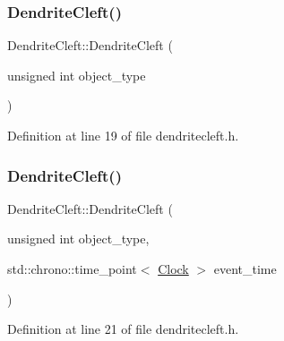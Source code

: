 \subsubsection{\texorpdfstring{Dendrite\+Cleft()}{DendriteCleft()}\hspace{0.1cm}{\footnotesize\ttfamily [2/4]}}
{\footnotesize\ttfamily Dendrite\+Cleft\+::\+Dendrite\+Cleft (\begin{DoxyParamCaption}\item[{unsigned int}]{object\+\_\+type }\end{DoxyParamCaption})\hspace{0.3cm}{\ttfamily [inline]}}



Definition at line 19 of file dendritecleft.\+h.

\mbox{\label{class_dendrite_cleft_ad4070ce743d8302bc120ea948890ea37}} 
\subsubsection{\texorpdfstring{Dendrite\+Cleft()}{DendriteCleft()}\hspace{0.1cm}{\footnotesize\ttfamily [3/4]}}
{\footnotesize\ttfamily Dendrite\+Cleft\+::\+Dendrite\+Cleft (\begin{DoxyParamCaption}\item[{unsigned int}]{object\+\_\+type,  }\item[{std\+::chrono\+::time\+\_\+point$<$ \hyperlink{universe_8h_a0ef8d951d1ca5ab3cfaf7ab4c7a6fd80}{Clock} $>$}]{event\+\_\+time }\end{DoxyParamCaption})\hspace{0.3cm}{\ttfamily [inline]}}



Definition at line 21 of file dendritecleft.\+h.

\mbox{\label{class_dendrite_cleft_abcb81284cd9bd7ee2863eecfb6b59f62}} 
